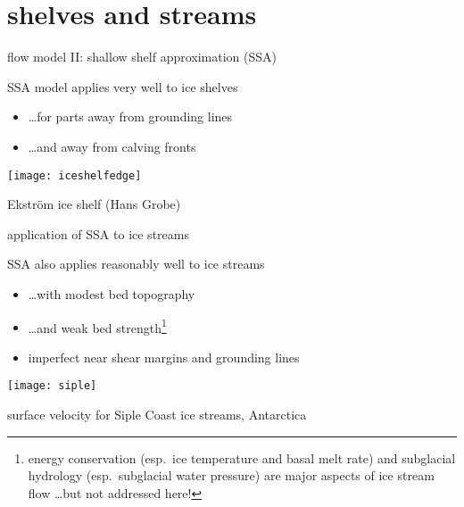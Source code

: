 
\section{shelves and streams}

\begin{frame}{flow model II: shallow shelf approximation (SSA)}
  
SSA model applies very well to \alert{ice shelves}
\begin{itemize}
\item \dots for parts away from grounding lines
\item \dots and away from calving fronts
\end{itemize}

\bigskip

\begin{center}
  \texttt{[image: iceshelfedge]}

\tiny Ekstr\"om ice shelf (Hans Grobe)
\end{center}
\end{frame}


\begin{frame}{application of SSA to ice streams}

SSA also applies reasonably well to \alert{ice streams}
\begin{itemize}
\item \dots with modest bed topography
\item \dots and weak bed strength\footnote{energy conservation (esp.~ice temperature and basal melt rate) and subglacial hydrology (esp.~subglacial water pressure) are major aspects of ice stream flow \dots but not addressed here!}
\item imperfect near shear margins and grounding lines
\end{itemize}

\begin{center}
  \texttt{[image: siple]}

\tiny surface velocity for Siple Coast ice streams, Antarctica 
\end{center}
\end{frame}


